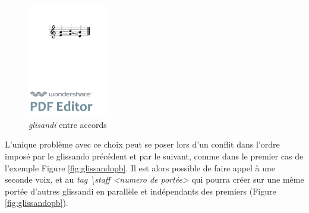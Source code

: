 \documentclass{article}
\newenvironment{gmncode}	{\vspace{-2mm}\small\verbatim}{\endverbatim\vspace{-2mm}}
\begin{document}
\begin{figure}[h]
\begin{center}
\begin{gmncode}
[\glissando({e,a} {f,b} {a,d})]
\end{gmncode}
\bigskip

\includegraphics[width=35mm]{img/glissandosimple.pdf}
\caption{\emph{glisandi} entre accords}
\label{fig:glissandosimple}
\end{center}
\end{figure}

L'unique problème avec ce choix peut se poser lors d'un conflit dans l'ordre imposé par le glissando précédent et par le suivant, comme dans le premier cas de l'exemple Figure \ref{fig:glissandopb}. Il est alors possible de faire appel à une seconde voix, et au \emph{tag \textbackslash{}staff \textless{}numero de portée\textgreater{}} qui pourra créer sur une même portée d'autres glissandi en parallèle et indépendants des premiers (Figure \ref{fig:glissandopb}).
\end{document}
